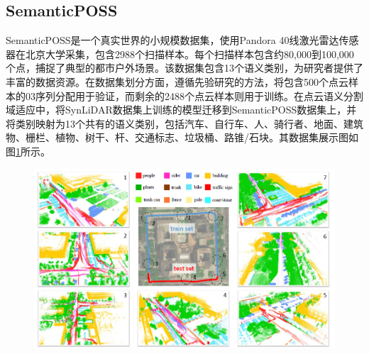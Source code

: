 \subsection{SemanticPOSS}
SemanticPOSS是一个真实世界的小规模数据集，使用Pandora 40线激光雷达传感器在北京大学采集，包含2988个扫描样本。每个扫描样本包含约80,000到100,000个点，捕捉了典型的都市户外场景。该数据集包含13个语义类别，为研究者提供了丰富的数据资源。在数据集划分方面，遵循先验研究的方法，将包含500个点云样本的03序列分配用于验证，而剩余的2488个点云样本则用于训练。在点云语义分割域适应中，将SynLiDAR数据集上训练的模型迁移到SemanticPOSS数据集上，并将类别映射为13个共有的语义类别，包括汽车、自行车、人、骑行者、地面、建筑物、栅栏、植物、树干、杆、交通标志、垃圾桶、路锥/石块。其数据集展示图如图\ref{fig:2-5}所示。
\begin{figure}[h]
    \centering
    \includegraphics[width = \textwidth, scale=0.5]{ljx/figure/2-5/poss.png}
    \label{fig:2-5}
    \vspace{-0.5cm} 
\end{figure}
